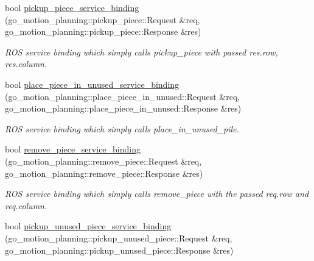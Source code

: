 \begin{DoxyCompactItemize}
\mbox{\label{classgo__motion__planner_ade2c6db47d4a71876bd7d7382858adb9}} 
bool \hyperlink{classgo__motion__planner_ade2c6db47d4a71876bd7d7382858adb9}{pickup\+\_\+piece\+\_\+service\+\_\+binding} (go\+\_\+motion\+\_\+planning\+::pickup\+\_\+piece\+::\+Request \&req, go\+\_\+motion\+\_\+planning\+::pickup\+\_\+piece\+::\+Response \&res)
\begin{DoxyCompactList}\small\item\em R\+OS service binding which simply calls pickup\+\_\+piece with passed res.\+row, res.\+column. \end{DoxyCompactList}\item 
\mbox{\label{classgo__motion__planner_a1b342edd58e79805e576cc241a2b39cd}} 
bool \hyperlink{classgo__motion__planner_a1b342edd58e79805e576cc241a2b39cd}{place\+\_\+piece\+\_\+in\+\_\+unused\+\_\+service\+\_\+binding} (go\+\_\+motion\+\_\+planning\+::place\+\_\+piece\+\_\+in\+\_\+unused\+::\+Request \&req, go\+\_\+motion\+\_\+planning\+::place\+\_\+piece\+\_\+in\+\_\+unused\+::\+Response \&res)
\begin{DoxyCompactList}\small\item\em R\+OS service binding which simply calls place\+\_\+in\+\_\+unused\+\_\+pile. \end{DoxyCompactList}\item 
\mbox{\label{classgo__motion__planner_a99b71bff95631b79ff39b30c58730813}} 
bool \hyperlink{classgo__motion__planner_a99b71bff95631b79ff39b30c58730813}{remove\+\_\+piece\+\_\+service\+\_\+binding} (go\+\_\+motion\+\_\+planning\+::remove\+\_\+piece\+::\+Request \&req, go\+\_\+motion\+\_\+planning\+::remove\+\_\+piece\+::\+Response \&res)
\begin{DoxyCompactList}\small\item\em R\+OS service binding which simply calls remove\+\_\+piece with the passed req.\+row and req.\+column. \end{DoxyCompactList}\item 
\mbox{\label{classgo__motion__planner_a21ff70114c6e31d121352c8bf9c7a962}} 
bool \hyperlink{classgo__motion__planner_a21ff70114c6e31d121352c8bf9c7a962}{pickup\+\_\+unused\+\_\+piece\+\_\+service\+\_\+binding} (go\+\_\+motion\+\_\+planning\+::pickup\+\_\+unused\+\_\+piece\+::\+Request \&req, go\+\_\+motion\+\_\+planning\+::pickup\+\_\+unused\+\_\+piece\+::\+Response \&res)

\end{DoxyCompactItemize}

